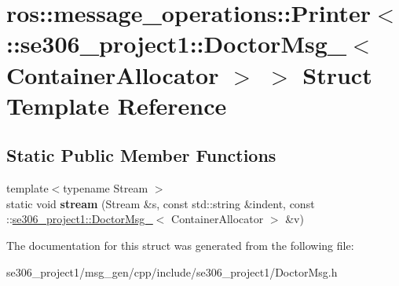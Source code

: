 \hypertarget{structros_1_1message__operations_1_1Printer_3_01_1_1se306__project1_1_1DoctorMsg___3_01ContainerAllocator_01_4_01_4}{\section{ros\-:\-:message\-\_\-operations\-:\-:Printer$<$ \-:\-:se306\-\_\-project1\-:\-:Doctor\-Msg\-\_\-$<$ Container\-Allocator $>$ $>$ Struct Template Reference}
\label{structros_1_1message__operations_1_1Printer_3_01_1_1se306__project1_1_1DoctorMsg___3_01ContainerAllocator_01_4_01_4}
}
\subsection*{Static Public Member Functions}
\begin{DoxyCompactItemize}
\item 
\hypertarget{structros_1_1message__operations_1_1Printer_3_01_1_1se306__project1_1_1DoctorMsg___3_01ContainerAllocator_01_4_01_4_a9edb461075970680eda73a334f371cc5}{{\footnotesize template$<$typename Stream $>$ }\\static void {\bfseries stream} (Stream \&s, const std\-::string \&indent, const \-::\hyperlink{structse306__project1_1_1DoctorMsg__}{se306\-\_\-project1\-::\-Doctor\-Msg\-\_\-}$<$ Container\-Allocator $>$ \&v)}\label{structros_1_1message__operations_1_1Printer_3_01_1_1se306__project1_1_1DoctorMsg___3_01ContainerAllocator_01_4_01_4_a9edb461075970680eda73a334f371cc5}

\end{DoxyCompactItemize}


The documentation for this struct was generated from the following file\-:\begin{DoxyCompactItemize}
\item 
se306\-\_\-project1/msg\-\_\-gen/cpp/include/se306\-\_\-project1/Doctor\-Msg.\-h\end{DoxyCompactItemize}
